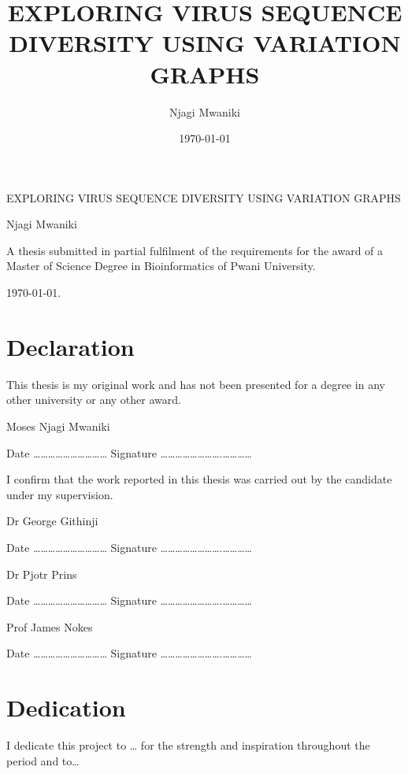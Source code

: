 \documentclass[10pt, a4paper]{article}
\author{Njagi Mwaniki}
\date{\today}
\title{EXPLORING VIRUS SEQUENCE DIVERSITY USING VARIATION GRAPHS}
\begin{document}
\begin{titlepage}
\centering
{\LARGE EXPLORING VIRUS SEQUENCE DIVERSITY USING VARIATION GRAPHS \par }
\vspace {8cm}
{\small Njagi Mwaniki \par}
\vspace {8cm} 
{\small A thesis submitted in partial fulfilment of the             requirements for the award of a Master of Science Degree in             Bioinformatics of Pwani University. \par}
\vspace {1mm} 
{\small \today. \par}
\end{titlepage}

\newcommand{\bigO}{\mathcal{O}}


\setcounter{secnumdepth}{0}
\newpage
\section{Declaration}
\label{sec:orgfbd546f}
This thesis is my original work and has not been presented for a degree in any other university or any other award.

\vspace{10mm}

Moses Njagi Mwaniki

Date …………………………    Signature …………………….…………

\vspace{20mm}
I confirm that the work reported in this thesis was carried out by the candidate under my supervision.

\vspace{10mm}

Dr George Githinji

Date …………………………    Signature …………………….…………

\vspace{10mm}

Dr Pjotr Prins

Date …………………………    Signature …………………….…………

\vspace{10mm}

Prof James Nokes

Date …………………………    Signature …………………….…………


\newpage

\section{Dedication}
\label{sec:org590b382}
I dedicate this project to \ldots{} for the strength and inspiration throughout the period and
to\ldots{}
\end{document}
